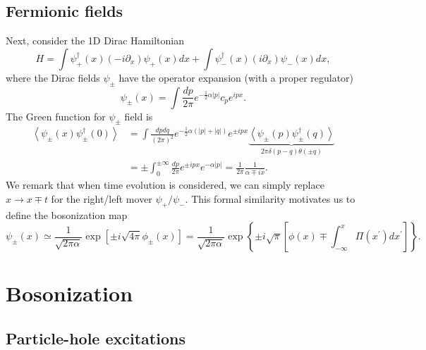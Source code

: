 \documentclass[aps,prb,superscriptaddress,nofootinbib]{revtex4}
\begin{document}
\subsection{Fermionic fields}
Next, consider the 1D Dirac Hamiltonian 
\begin{equation}
	H = \int \psi_+^\dagger(x)(-i\partial_x)\psi_+(x) dx + \int \psi_-^\dagger(x)(i\partial_x)\psi_-(x) dx,
\end{equation}
where the Dirac fields $\psi_\pm$ have the operator expansion (with a proper regulator)
\begin{equation}
	\psi_\pm(x) = \int \frac{dp}{2\pi} e^{-\frac{1}{2}\alpha|p|}c_p e^{ipx}.
\end{equation}
The Green function for $\psi_\pm$ field is
\begin{equation*}
\begin{aligned}
	\left\langle\psi_{\pm}(x) \psi_{\pm}^{\dagger}(0)\right\rangle 
	&= \int \frac{d p dq}{(2 \pi)^2} e^{-\frac{1}{2} \alpha(|p|+|q|)} e^{\pm i p x} \underbrace{\left\langle\psi_{\pm}(p) \psi_{\pm}^{\dagger}(q)\right\rangle}_{2 \pi \delta(p-q) \theta(\pm q)} \\
	&= \pm\int_0^{\pm \infty} \frac{d p}{2 \pi} e^{\pm i p x} e^{-\alpha|p|}
	= \frac{1}{2\pi} \frac{1}{\alpha \mp ix}.
\end{aligned}
\end{equation*}
We remark that when time evolution is considered, we can simply replace $x \rightarrow x \mp t$ for the right/left mover $\psi_+/\psi_-$.
This formal similarity motivates us to define the bosonization map
\begin{equation}\label{eq:bosonization}
	\psi_\pm(x) \simeq \frac{1}{\sqrt{2\pi\alpha}} \exp\left[\pm i\sqrt{4\pi}\phi_\pm(x)\right]
	=\frac{1}{\sqrt{2 \pi \alpha}} \exp \left\{\pm i \sqrt{\pi}\left[\phi(x) \mp \int_{-\infty}^x \Pi\left(x^{\prime}\right) d x^{\prime}\right]\right\}.
\end{equation}





\section{Bosonization}

\subsection{Particle-hole excitations}
\end{document}
